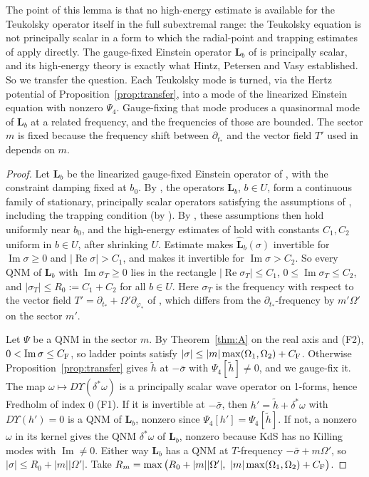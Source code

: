 \documentclass[11pt]{amsart}
\theoremstyle{definition}
\theoremstyle{remark}
\numberwithin{equation}{section}
\renewcommand{\Im}{\operatorname{Im}}
\renewcommand{\Re}{\operatorname{Re}}
\begin{document}
The point of this lemma is that no high-energy estimate is available for the Teukolsky operator itself in the full
subextremal range: the Teukolsky equation is not principally scalar in a form to which the radial-point and trapping
estimates of \cite{HV18} apply directly. The gauge-fixed Einstein operator $\mathbf L_b$ of \cite{HPV25} is
principally scalar, and its high-energy theory is exactly what Hintz, Petersen and Vasy established. So we transfer
the question. Each Teukolsky mode is turned, via the Hertz potential of Proposition~\ref{prop:transfer}, into a
mode of the linearized Einstein equation with nonzero $\Psi_4$. Gauge-fixing that mode produces a quasinormal mode of
$\mathbf L_b$ at a related frequency, and the frequencies of those are bounded. The sector $m$ is fixed because the
frequency shift between $\partial_{t_*}$ and the vector field $T'$ used in \cite{HPV25} depends on $m$.

\begin{proof}
Let $\mathbf L_b$ be the linearized gauge-fixed Einstein operator of \cite[(23)]{HPV25}, with the constraint damping fixed at
$b_0$. By \cite[Remark~2.12 and \S2.5]{HPV25}, the operators $\mathbf L_b$, $b\in U$, form a continuous family of stationary,
principally scalar operators satisfying the assumptions of \cite[\S5.1]{HV18}, including the trapping condition
(by \cite[Theorem~3.1]{HPV25}). By \cite[\S5.1.2]{HV18}, these assumptions then hold uniformly near $b_0$, and the
high-energy estimates of \cite[Theorem~5.4]{HV18} hold with constants $C_1,C_2$ uniform in $b\in U$, after shrinking $U$.
Estimate \cite[(5.7)]{HV18} makes $\widehat{\mathbf L}_b(\sigma)$ invertible for $\Im\sigma\ge0$ and $|\Re\sigma|>C_1$, and
\cite[(5.8)]{HV18} makes it invertible for $\Im\sigma>C_2$. So every QNM of $\mathbf L_b$ with $\Im\sigma_T\ge0$ lies in
the rectangle $|\Re\sigma_T|\le C_1$, $0\le\Im\sigma_T\le C_2$, and $|\sigma_T|\le R_0:=C_1+C_2$ for all $b\in U$. Here $\sigma_T$
is the frequency with respect to the vector field $T'=\partial_{t_*}+\Omega'\partial_{\varphi_*}$ of \cite{HPV25}, which differs
from the $\partial_{t_*}$-frequency by $m'\Omega'$ on the sector $m'$.

Let $\Psi$ be a QNM in the sector $m$. By Theorem~\ref{thm:A} on the real axis and (F2), $0<\Im\sigma\le C_{\rm F}$, so
ladder points satisfy $|\sigma|\le|m|\max(\Omega_1,\Omega_2)+C_{\rm F}$. Otherwise Proposition~\ref{prop:transfer} gives
$\tilde h$ at $-\bar\sigma$ with $\Psi_4[\tilde h]\ne0$, and we gauge-fix it. The map $\omega\mapsto D\Upsilon(\delta^*\omega)$
is a principally scalar wave operator on 1-forms, hence Fredholm of index $0$ (F1). If it is invertible at
$-\bar\sigma$, then $h'=\tilde h+\delta^*\omega$ with $D\Upsilon(h')=0$ is a QNM of $\mathbf L_b$, nonzero since
$\Psi_4[h']=\Psi_4[\tilde h]$. If not, a nonzero $\omega$ in its kernel gives the QNM $\delta^*\omega$ of $\mathbf L_b$, nonzero
because KdS has no Killing modes with $\Im\ne0$. Either way $\mathbf L_b$ has a QNM at $T$-frequency $-\bar\sigma+m\Omega'$, so
$|\sigma|\le R_0+|m||\Omega'|$. Take $R_m=\max\big(R_0+|m||\Omega'|,\ |m|\max(\Omega_1,\Omega_2)+C_{\rm F}\big)$.
\end{proof}
\end{document}
